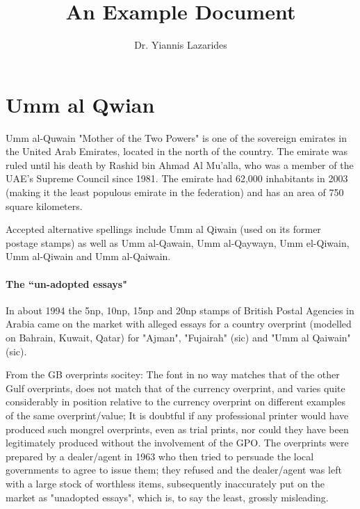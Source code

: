 \documentclass{book}      %
\title{An Example Document}  %
\author{Dr. Yiannis Lazarides}      %
\newcommand{\ph}[3][1]{%
 \begin{figure}[htbp]
   \texttt{[image: \#2]}
   \caption{#3}
 \end{figure}}
\begin{document}

\maketitle                   %




\chapter{Umm al Qwian}  

Umm al-Quwain  "Mother of the Two Powers" is one of the sovereign emirates in the United Arab Emirates, located in the north of the country. The emirate was ruled until his death by Rashid bin Ahmad Al Mu'alla, who was a member of the UAE's Supreme Council since 1981. The emirate had 62,000 inhabitants in 2003 (making it the least populous emirate in the federation) and has an area of 750 square kilometers. 

Accepted alternative spellings include Umm al Qiwain (used on its former postage stamps) as well as Umm al-Qawain, Umm al-Qaywayn, Umm el-Qiwain, Umm al-Qiwain and Umm al-Qaiwain.

\subsubsection{The ``un-adopted essays"}
In about 1994 the 5np, 10np, 15np and 20np stamps of British Postal Agencies in Arabia came on the market with alleged essays for a country overprint (modelled on Bahrain, Kuwait, Qatar) for "Ajman", "Fujairah" (sic) and "Umm al Qaiwain" (sic). 


From the GB overprints socitey: The font in no way matches that of the other Gulf overprints, does not match that of the currency overprint, and varies quite considerably in position relative to the currency overprint on different examples of the same overprint/value; It is doubtful if any professional printer would have produced such mongrel overprints, even as trial prints, nor could they have been legitimately produced without the involvement of the GPO. The overprints were prepared by a dealer/agent in 1963 who then tried to persuade the local governments to agree to issue them; they refused and the dealer/agent was left with a large stock of worthless items, subsequently inaccurately put on the market as "unadopted essays", which is, to say the least, grossly misleading. 
\end{document}
